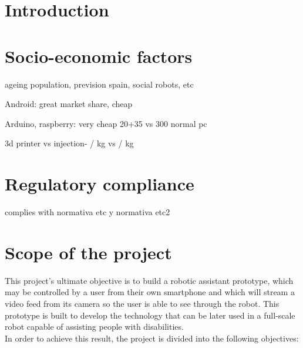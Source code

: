 \section{Introduction}




\section{Socio-economic factors}

ageing population, prevision spain, social robots, etc


Android: great market share, cheap

Arduino, raspberry: very cheap 20+35  vs 300 normal pc

3d printer vs injection- / kg vs / kg




\section{Regulatory compliance}

complies with normativa etc y normativa etc2

\section{Scope of the project}

This project's ultimate objective is to build a robotic assistant prototype, which may be controlled by a user from their own smartphone and which will stream a video feed from its camera so the user is able to see through the robot. This prototype is built to develop the technology that can be later used in a full-scale robot capable of assisting people with disabilities.\\

In order to achieve this result, the project is divided into the following objectives:


